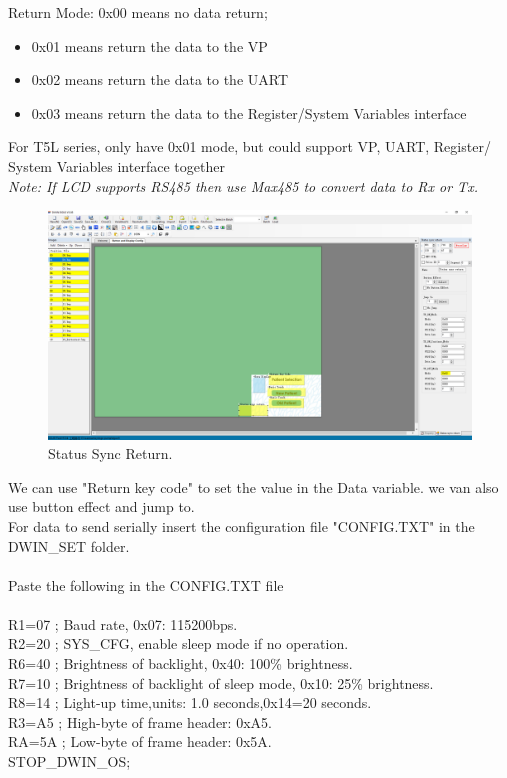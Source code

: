 \documentclass[12pt, A4]{article} %
\begin{document}
Return Mode: 0x00 means no data return;
\begin{itemize}
\item 0x01 means return the data to the VP
\item 0x02 means return the data to the UART
\item 0x03 means return the data to the Register/System Variables interface
\end{itemize}
                         
For T5L series, only have 0x01 mode, but could support VP, UART, Register/ System Variables interface together\\

 
\emph{Note: If LCD supports RS485 then use Max485 to convert data to Rx or Tx.}
\begin{figure}[!htb] %
	\centering
	\includegraphics[width=15cm]{statusSync} 
	\caption{Status Sync Return.\\}
\end{figure}

We can use "Return key code" to set the value in the Data variable. we van also use button effect and jump to.\\

For data to send serially insert the configuration file "CONFIG.TXT" in the DWIN\_SET folder.\\ \\
Paste the following in the CONFIG.TXT file\\ \\
R1=07 ; Baud rate, 0x07: 115200bps.\\
R2=20 ; SYS\_CFG, enable sleep mode if no operation.\\
R6=40 ; Brightness of backlight, 0x40: 100\% brightness.\\
R7=10 ; Brightness of backlight of sleep mode, 0x10: 25\% brightness.\\
R8=14 ; Light-up time,units: 1.0 seconds,0x14=20 seconds.\\
R3=A5 ; High-byte of frame header: 0xA5.\\
RA=5A ; Low-byte of frame header: 0x5A.\\
STOP\_DWIN\_OS; \\
\end{document}
